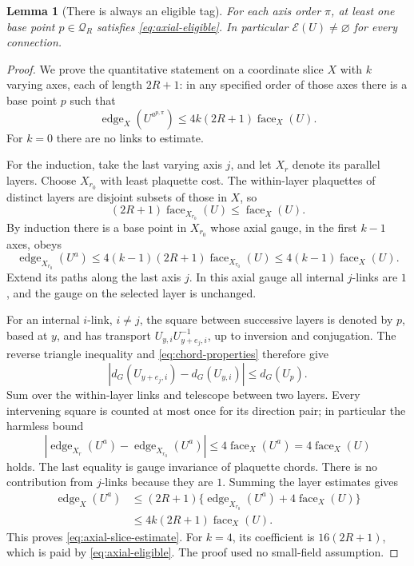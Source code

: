 \documentclass[11pt,reqno]{amsart}
\numberwithin{equation}{section}
\newtheorem{lemma}[theorem]{Lemma}
\theoremstyle{definition}
\theoremstyle{remark}
\begin{document}
\begin{lemma}[There is always an eligible tag]
\label{lem:eligible-tag}
For each axis order \(\pi\), at least one base point
\(p\in\mathcal Q_R\) satisfies \eqref{eq:axial-eligible}.
In particular \(\mathcal E(U)\ne\varnothing\) for every connection.
\end{lemma}
\begin{proof}
We prove the quantitative statement on a coordinate slice \(X\)
with \(k\) varying axes, each of length \(2R+1\): in any specified
order of those axes there is a base point \(p\) such that
\begin{equation}
       \operatorname{edge}_X(U^{a^{p,\pi}})
           \le4k(2R+1)\operatorname{face}_X(U).
 \label{eq:axial-slice-estimate}
\end{equation}
For \(k=0\) there are no links to estimate.

For the induction, take the last varying axis \(j\), and let
\(X_r\) denote its parallel layers. Choose \(X_{r_0}\) with
least plaquette cost. The within-layer plaquettes of distinct
layers are disjoint subsets of those in \(X\), so
\[
       (2R+1)\operatorname{face}_{X_{r_0}}(U)
                                      \le\operatorname{face}_X(U).
\]
By induction there is a base point in \(X_{r_0}\) whose axial
gauge, in the first \(k-1\) axes, obeys
\[
 \operatorname{edge}_{X_{r_0}}(U^{a})
    \le4(k-1)(2R+1)\operatorname{face}_{X_{r_0}}(U)
    \le4(k-1)\operatorname{face}_X(U).
\]
Extend its paths along the last axis \(j\). In this axial gauge
all internal \(j\)-links are \(1\), and the gauge on the selected
layer is unchanged.

For an internal \(i\)-link, \(i\ne j\), the square between
successive layers is denoted by \(p\), based at \(y\), and has transport
\(U_{y,i}U_{y+e_j,i}^{-1}\), up to inversion and conjugation.
The reverse triangle inequality and
\eqref{eq:chord-properties} therefore give
\[
       |d_G(U_{y+e_j,i})-d_G(U_{y,i})|
                              \le d_G(U_p).
\]
Sum over the within-layer links and telescope between two layers.
Every intervening square is counted at most once for its
direction pair; in particular the harmless bound
\[
 |\operatorname{edge}_{X_r}(U^a)
          -\operatorname{edge}_{X_{r_0}}(U^a)|
                        \le4\operatorname{face}_X(U^a)
                        =4\operatorname{face}_X(U)
\]
holds. The last equality is gauge invariance of plaquette chords.
There is no contribution from \(j\)-links because they are \(1\).
Summing the layer estimates gives
\begin{align*}
 \operatorname{edge}_X(U^a)
 &\le(2R+1)\bigl\{\operatorname{edge}_{X_{r_0}}(U^a)
                                +4\operatorname{face}_X(U)\bigr\}\\
 &\le4k(2R+1)\operatorname{face}_X(U).
\end{align*}
This proves \eqref{eq:axial-slice-estimate}. For \(k=4\), its
coefficient is \(16(2R+1)\), which is paid by
\eqref{eq:axial-eligible}. The proof used no small-field assumption.
\end{proof}
\end{document}

